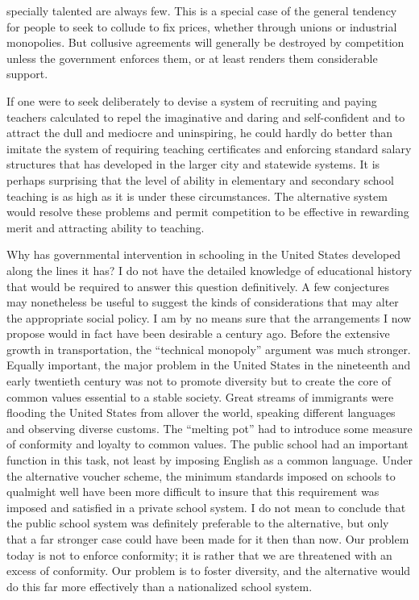 \documentclass[11pt,openany]{book}
\begin{document}
specially talented are always few. This is a special case of the general tendency for people to seek to collude to fix prices, whether through unions or industrial monopolies. But collusive agreements will generally be destroyed by competition unless the government enforces them, or at least renders them considerable support.

If one were to seek deliberately to devise a system of recruiting and paying teachers calculated to repel the imaginative and daring and self-confident and to attract the dull and mediocre and uninspiring, he could hardly do better than imitate the system of requiring teaching certificates and enforcing standard salary structures that has developed in the larger city and statewide systems. It is perhaps surprising that the level of ability in elementary and secondary school teaching is as high as it is under these circumstances. The alternative system would resolve these problems and permit competition to be effective in rewarding merit and attracting ability to teaching.

Why has governmental intervention in schooling in the United States developed along the lines it has? I do not have the detailed knowledge of educational history that would be required to answer this question definitively. A few conjectures may nonetheless be useful to suggest the kinds of considerations that may alter the appropriate social policy. I am by no means sure that the arrangements I now propose would in fact have been desirable a century ago. Before the extensive growth in transportation, the ``technical monopoly'' argument was much stronger. Equally important, the major problem in the United States in the nineteenth and early twentieth century was not to promote diversity but to create the core of common values essential to a stable society. Great streams of immigrants were flooding the United States from allover the world, speaking different languages and observing diverse customs. The ``melting pot'' had to introduce some measure of conformity and loyalty to common values. The public school had an important function in this task, not least by imposing English as a common language. Under the alternative voucher scheme, the minimum standards imposed on schools to qualmight well have been more difficult to insure that this requirement was imposed and satisfied in a private school system. I do not mean to conclude that the public school system was definitely preferable to the alternative, but only that a far stronger case could have been made for it then than now. Our problem today is not to enforce conformity; it is rather that we are threatened with an excess of conformity. Our problem is to foster diversity, and the alternative would do this far more effectively than a nationalized school system.
\end{document}
